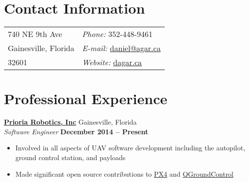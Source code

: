 \documentclass[margin,line]{res}
\begin{document}

\begin{resume}


  \section{\sc Contact Information}

    \vspace{.05in}

    \begin{tabular}{@{}p{3.5in}p{4in}}
      740 NE 9th Ave                  & {\it Phone:}  352-448-9461 \\                     
      Gainesville, Florida         & {\it E-mail:}  \href{mailto:daniel@agar.ca}{daniel@agar.ca}\\       
      32601                          & {\it Website:} \href{http://dagar.ca}{dagar.ca} \\     
    \end{tabular}
    
    

  \section{\sc Professional Experience}

        \href{http://www.prioria.com/}{\bf Prioria Robotics, Inc} {\hfill Gainesville, Florida}\\
      {\em Software Engineer} \hfill {\bf December 2014 -- Present}
      \begin{itemize} \itemsep -2pt
        \item Involved in all aspects of UAV software development including the autopilot, ground control station, and payloads
        \item Made significant open source contributions to \href{https://github.com/PX4/Firmware}{PX4} and \href{https://github.com/mavlink/qgroundcontrol}{QGroundControl}
      \end{itemize}
  

\end{resume}
\end{document}
